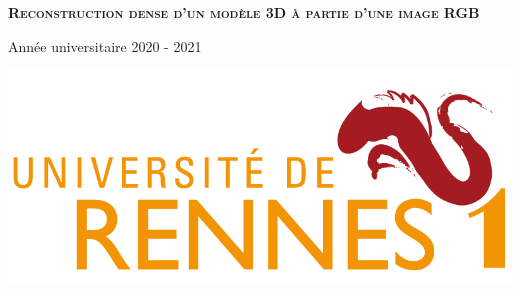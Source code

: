 \begin{titlepage}
\begin{center}
    \vspace{4cm}

    \textsc{\Huge \textbf{Reconstruction dense d'un modèle 3D à partie d'une image RGB}}\\    

    \vfill

    \begin{minipage}{0.45\textwidth}
      \begin{flushleft}
        \vspace{0.5cm}
        {\large Année universitaire 2020 - 2021}
      \end{flushleft}
    \end{minipage}
    \begin{minipage}{0.45\textwidth}
      \begin{flushright}
        \includegraphics[width=0.9\columnwidth]{datas/logo_univ.png}~\\
      \end{flushright}
    \end{minipage}

  \end{center}
\end{titlepage}